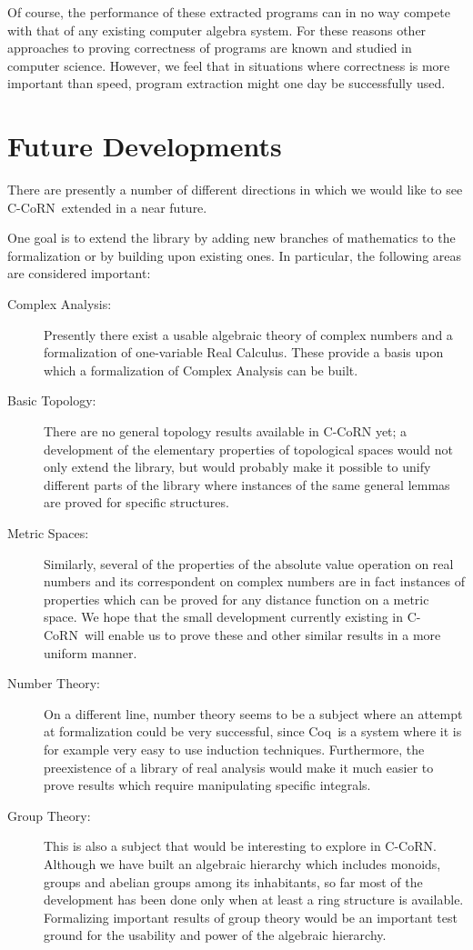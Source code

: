\documentclass[runningheads]{llncs}
\newcommand{\ccorn}{\mbox{C-CoRN}}
\newcommand{\coq}{Coq}
\newcommand{\weg}[1]{}
\begin{document}
Of course, the performance of these extracted programs can in no way compete
with that of any existing computer algebra system.
For these reasons other approaches to proving correctness of programs are
known and studied in computer science.
However, we feel that in situations where correctness is more important than
speed, program extraction might one day be successfully used.

\weg{
Another application of libraries of formalized mathematics in general, and
of \ccorn\ in particular, is to education.
This is discussed in more detail in the next section.
}

\section{Future Developments\label{future}}

There are presently a number of different directions in which we would like to
see \ccorn\ extended in a near future.

One goal is to extend the library by adding new branches of mathematics to the
formalization or by building upon existing ones.
In particular, the following areas are considered important:
\begin{description}
\item[Complex Analysis:] Presently there exist a usable algebraic theory of
complex numbers and a formalization of one-variable Real Calculus.
These provide a basis upon which a formalization of Complex Analysis can be
built.
\item[Basic Topology:] There are no general topology results available in
{\ccorn} yet; a development of the elementary properties of topological spaces would
not only extend the library, but would probably make it possible to unify
different parts of the library where instances of the same general lemmas are
proved for specific structures.
\item[Metric Spaces:] Similarly, several of the properties of the absolute
value operation on real numbers and its correspondent on complex numbers are
in fact instances of properties which can be proved for any distance function
on a metric space.
We hope that the small development currently existing in \ccorn\ will enable
us to prove these and other similar results in a more uniform manner.
\item[Number Theory:] On a different line, number theory seems to be a subject
where an attempt at formalization could be very successful, since \coq\ is a
system where it is for example very easy to use induction techniques.
Furthermore, the preexistence of a library of real analysis would make it
much easier to prove results
which require manipulating specific integrals.
\item[Group Theory:] This is also a subject that would be interesting to
explore in \ccorn.
Although we have built an algebraic hierarchy which includes monoids, groups
and abelian groups among its inhabitants, so far most of the development has
been done only when at least a ring structure is available.
Formalizing important results of group theory would be an important test ground
for the usability and power of the algebraic hierarchy.
\end{description}
\end{document}
